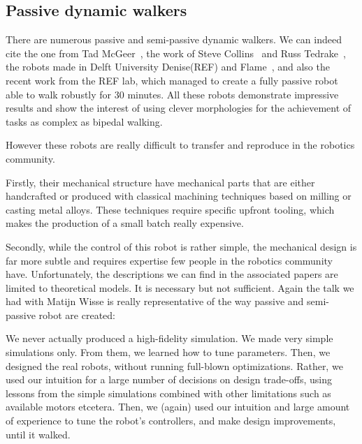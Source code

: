 

\subsection{Passive dynamic walkers} %

There are numerous passive and semi-passive dynamic walkers. We can indeed cite the one from Tad McGeer~\parencite{mcgeer1990passive}, the work of Steve Collins~\parencite{collins2001three} and Russ Tedrake~\parencite{tedrake2005learning}, the robots made in Delft University Denise(REF) and Flame~\parencite{Hobbelen2008}, and also the recent work from the REF lab, which managed to create a fully passive robot able to walk robustly for 30 minutes. All these robots demonstrate impressive results and show the interest of using clever morphologies for the achievement of tasks as complex as bipedal walking.

However these robots are really difficult to transfer and reproduce in the robotics community.

Firstly, their mechanical structure have mechanical parts that are either handcrafted or produced with classical machining techniques based on milling or casting metal alloys. These techniques require specific upfront tooling, which makes the production of a small batch really expensive.

Secondly, while the control of this robot is rather simple, the mechanical design is far more subtle and requires expertise few people in the robotics community have. Unfortunately, the descriptions we can find in the associated papers are limited to theoretical models. It is necessary but not sufficient. Again the talk we had with Matijn Wisse is really representative of the way passive and semi-passive robot are created:

\begin{formal}
We never actually produced a high-fidelity simulation. We made very simple simulations only. From them, we learned how to tune parameters. Then, we designed the real robots, without running full-blown optimizations. Rather, we used our intuition for a large number of decisions on design trade-offs, using lessons from the simple simulations combined with other limitations such as available motors etcetera. Then, we (again) used our intuition and large amount of experience to tune the robot’s controllers, and make design improvements, until it walked.

\end{formal}

